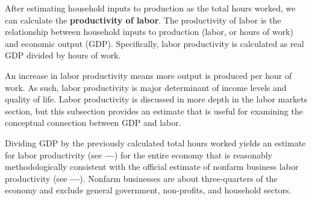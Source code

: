 \documentclass{report}
\begin{document}
\begin{minipage}{0.76\textwidth}
\small After estimating household inputs to production as the total hours worked, we can calculate the \textbf{productivity of labor}. The productivity of labor is the relationship between household inputs to production (labor, or hours of work) and economic output (GDP). Specifically, labor productivity is calculated as real GDP divided by hours of work. 

An increase in labor productivity means more output is produced per hour of work. As such, labor productivity is major determinant of income levels and quality of life. Labor productivity is discussed in more depth in the labor markets section, but this subsection provides an estimate that is useful for examining the conceptual connection between GDP and labor.

Dividing GDP by the previously calculated total hours worked yields an estimate for labor productivity (see {\color{cyan!60!white}\textbf{---}}) for the entire economy that is reasonably methodologically consistent with the official estimate of nonfarm business labor productivity (see {\color{violet}\textbf{---}}). Nonfarm businesses are about three-quarters of the economy and exclude general government, non-profits, and household sectors. 
\end{minipage}
\vspace{1mm}
\end{document}
